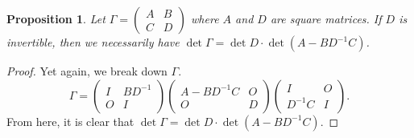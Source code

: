 \documentclass[15pt,a4paper]{book}
\newtheorem{proposition}[theorem]{Proposition}
\theoremstyle{definition}
\begin{document}
\begin{proposition}
    Let $\Gamma = \begin{pmatrix}
        A & B \\ C & D
    \end{pmatrix}$ where $A$ and $D$ are square matrices. If $D$ is invertible, then we necessarily have $\det \Gamma = \det D \cdot \det (A - BD^{-1}C)$.
\end{proposition}
\begin{proof}
    Yet again, we break down $\Gamma$.
    \begin{equation}
        \Gamma = \begin{pmatrix}
            I & BD^{-1} \\ O & I
        \end{pmatrix} \begin{pmatrix}
            A-BD^{-1}C & O \\ O & D
        \end{pmatrix} \begin{pmatrix}
            I & O \\ D^{-1}C & I
        \end{pmatrix}.
    \end{equation}
    From here, it is clear that $\det \Gamma = \det{D} \cdot \det(A-BD^{-1}C)$.
\end{proof}
\end{document}
